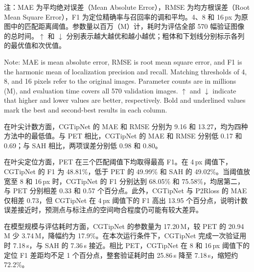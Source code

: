 \begin{table}[H]
\begin{minipage}{\linewidth}
    \normalfont{}\raggedright
    \noindent 注：MAE 为平均绝对误差（Mean Absolute Error），RMSE 为均方根误差（Root Mean Square Error），F1 为定位精确率与召回率的调和平均。4、8 和 16\,px 为原图中的匹配距离阈值。参数量以百万（M）计，耗时为评估全部 570 幅验证图像的总时间。\(\uparrow\) 和 \(\downarrow\) 分别表示越大越优和越小越优；粗体和下划线分别标示各列的最优值和次优值。\par
    \vspace{2pt}
    \noindent Note: MAE is mean absolute error, RMSE is root mean square error, and F1 is the harmonic mean of localization precision and recall. Matching thresholds of 4, 8, and 16 pixels refer to the original images. Parameter counts are in millions (M), and evaluation time covers all 570 validation images. \(\uparrow\) and \(\downarrow\) indicate that higher and lower values are better, respectively. Bold and underlined values mark the best and second-best results in each column.\par
  \end{minipage}\par
\end{table}
在叶尖计数方面，CGTipNet 的 MAE 和 RMSE 分别为 9.16 和 13.27，均为四种方法中的最低值。与 PET 相比，CGTipNet 的 MAE 和 RMSE 分别低 0.17 和 0.69；与 SAH 相比，两项误差分别低 0.98 和 0.80。\par
在叶尖定位方面，PET 在三个匹配阈值下均取得最高 F1。在 4\,px 阈值下，CGTipNet 的 F1 为 48.81\%，低于 PET 的 49.99\% 和 SAH 的 49.02\%。当阈值放宽至 8 和 16\,px 时，CGTipNet 的 F1 分别达到 68.05\% 和 75.58\%，均居第二，与 PET 分别相差 0.33 和 0.57 个百分点。此外，CGTipNet 与 P2Rloss 的 MAE 仅相差 0.73，但 CGTipNet 在 4\,px 阈值下的 F1 高出 13.95 个百分点，说明计数误差接近时，预测点与标注点的空间吻合程度仍可能有较大差异。\par
在模型规模与评估耗时方面，CGTipNet 的参数量为 17.20\,M，较 PET 的 20.94\,M 少 3.74\,M，降幅约为 17.9\%。在本次运行条件下，CGTipNet 完成一次验证用时 7.18\,s，与 SAH 的 7.36\,s 接近。相比 PET，CGTipNet 在 8 和 16\,px 阈值下的定位 F1 差距均不足 1 个百分点，整套验证耗时由 25.86\,s 降至 7.18\,s，缩短约 72.2\%。

